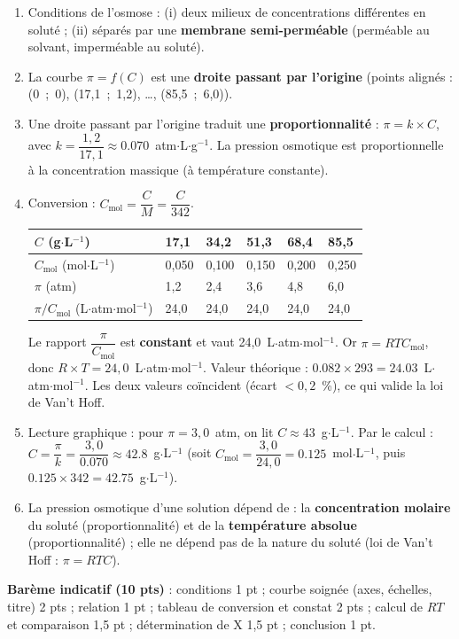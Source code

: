 \documentclass[11pt]{article}
\begin{document}
\begin{corrige}
\begin{enumerate}
\item Conditions de l'osmose : (i) deux milieux de concentrations différentes en soluté ; (ii) séparés par une \textbf{membrane semi-perméable} (perméable au solvant, imperméable au soluté).
\item La courbe $\pi = f(C)$ est une \textbf{droite passant par l'origine} (points alignés : (0~;~0), (17,1~;~1,2), \ldots, (85,5~;~6,0)).
\item Une droite passant par l'origine traduit une \textbf{proportionnalité} : $\pi = k \times C$, avec $k = \dfrac{1,2}{17,1} \approx \num{0,070}$~atm$\cdot$L$\cdot$g$^{-1}$. La pression osmotique est proportionnelle à la concentration massique (à température constante).
\item Conversion : $C_{\text{mol}} = \dfrac{C}{M} = \dfrac{C}{342}$.

\begin{center}
\begin{tabularx}{\linewidth}{|l|*{5}{X|}}
\hline
\rowcolor{popblueL} $C$ (g$\cdot$L$^{-1}$) & 17,1 & 34,2 & 51,3 & 68,4 & 85,5 \\
\hline
$C_{\text{mol}}$ (mol$\cdot$L$^{-1}$) & 0,050 & 0,100 & 0,150 & 0,200 & 0,250 \\
\hline
$\pi$ (atm) & 1,2 & 2,4 & 3,6 & 4,8 & 6,0 \\
\hline
$\pi / C_{\text{mol}}$ (L$\cdot$atm$\cdot$mol$^{-1}$) & 24,0 & 24,0 & 24,0 & 24,0 & 24,0 \\
\hline
\end{tabularx}
\end{center}

Le rapport $\dfrac{\pi}{C_{\text{mol}}}$ est \textbf{constant} et vaut 24,0~L$\cdot$atm$\cdot$mol$^{-1}$. Or $\pi = R T C_{\text{mol}}$, donc $R \times T = 24,0$~L$\cdot$atm$\cdot$mol$^{-1}$. Valeur théorique : $\num{0,082} \times 293 = \num{24,03}$~L$\cdot$atm$\cdot$mol$^{-1}$. Les deux valeurs coïncident (écart $< 0,2$~\%), ce qui valide la loi de Van't Hoff.
\item Lecture graphique : pour $\pi = 3,0$~atm, on lit $C \approx 43$~g$\cdot$L$^{-1}$. Par le calcul : $C = \dfrac{\pi}{k} = \dfrac{3,0}{\num{0,070}} \approx \num{42,8}$~g$\cdot$L$^{-1}$ (soit $C_{\text{mol}} = \dfrac{3,0}{24,0} = \num{0,125}$~mol$\cdot$L$^{-1}$, puis $\num{0,125} \times 342 = \num{42,75}$~g$\cdot$L$^{-1}$).
\item La pression osmotique d'une solution dépend de : la \textbf{concentration molaire} du soluté (proportionnalité) et de la \textbf{température absolue} (proportionnalité) ; elle ne dépend pas de la nature du soluté (loi de Van't Hoff : $\pi = RTC$).
\end{enumerate}
\textbf{Barème indicatif (10 pts)} : conditions 1 pt ; courbe soignée (axes, échelles, titre) 2 pts ; relation 1 pt ; tableau de conversion et constat 2 pts ; calcul de $RT$ et comparaison 1,5 pt ; détermination de X 1,5 pt ; conclusion 1 pt.
\end{corrige}
\end{document}
